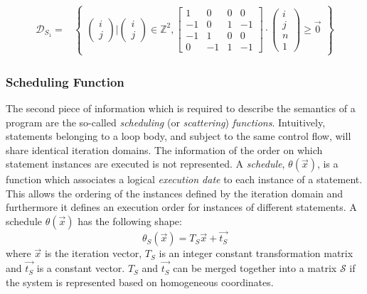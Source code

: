 \begin{align*}
\mathcal{D}_{S_1} = & \begin{Bmatrix} 
	\begin{pmatrix} i \\ j \end{pmatrix} \big|
	\begin{pmatrix} i \\ j \end{pmatrix} \in \mathbb{Z}^2,
	\begin{bmatrix} 1 & 0 & 0 & 0\\ -1 & 0 & 1 & -1 \\ 
			-1 & 1 & 0 & 0 \\  0 & -1 & 1 & -1 
	\end{bmatrix} \cdot
	\begin{pmatrix} i \\ j \\ n \\ 1 \end{pmatrix}
	\ge \vec{0}
\end{Bmatrix}
\end{align*}

\subsubsection{Scheduling Function}
The second piece of information which is required to describe the semantics of a
program are the so-called \emph{scheduling} (or \emph{scattering})
\emph{functions}. Intuitively, statements belonging to a loop body, and subject
to the same control flow, will share identical iteration domains. The
information of the order on which statement instances are executed is not
represented. A \emph{schedule}, $\theta(\vec{x})$, is a function which
associates a logical \emph{execution date} to each instance of a statement. This
allows the ordering of the instances defined by the iteration domain and
furthermore it defines an execution order for instances of different statements.
A schedule $\theta(\vec{x})$ has the following shape:
\[
\theta_S (\vec{x}) = T_S\vec{x} + \vec{t_S}
\]
where $\vec{x}$ is the iteration vector, $T_S$ is an integer constant
transformation matrix and $\vec{t_S}$ is a constant vector. $T_S$ and
$\vec{t_S}$ can be merged together into a matrix $\mathcal{S}$ if the system is
represented based on homogeneous coordinates. 

